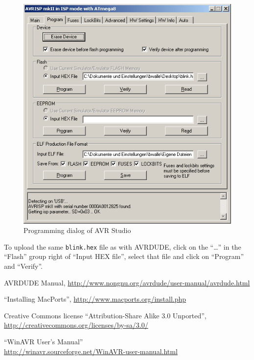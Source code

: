 \documentclass[bibtotoc,UKenglish,halfparskip,oneside,DIV12]{scrreprt}
\begin{document}
\begin{figure}[p]
  \centering
  \includegraphics[scale=0.6]{images/avrstudio_02.png}
  \caption{Programming dialog of AVR Studio}
  \label{fig:avrstudio_programming}
\end{figure}

To upload the same \texttt{blink.hex} file as with AVRDUDE, click on the ``\ldots'' in the ``Flash''
group right of ``Input HEX file'', select that file and click on ``Program'' and ``Verify''.


\begin{thebibliography}{99}
   AVRDUDE Manual,
    \url{http://www.nongnu.org/avrdude/user-manual/avrdude.html}

   ``Installing MacPorts'', \url{http://www.macports.org/install.php}

   Creative Commons license ``Attribution-Share Alike 3.0 Unported'', \newline
    \url{http://creativecommons.org/licenses/by-sa/3.0/}


   ``WinAVR User's Manual'' \\
    \url{http://winavr.sourceforge.net/WinAVR-user-manual.html}

\end{thebibliography}
\end{document}
